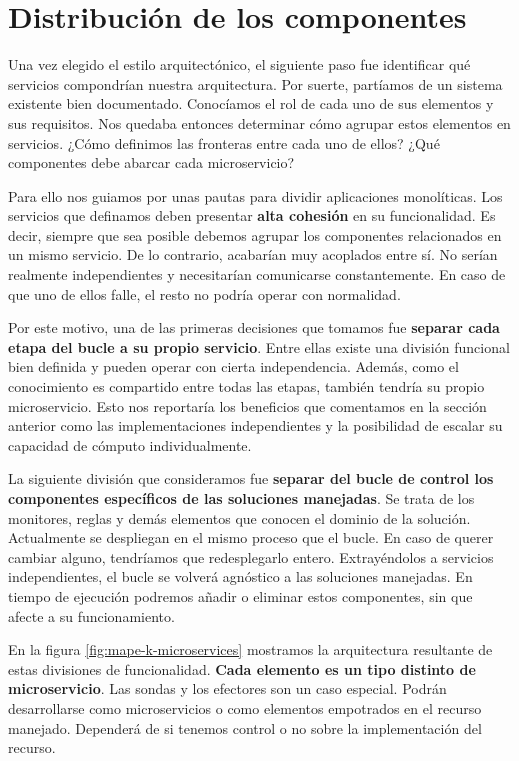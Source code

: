 \section{Distribución de los componentes}

Una vez elegido el estilo arquitectónico, el siguiente paso fue identificar qué servicios compondrían nuestra arquitectura. Por suerte, partíamos de un sistema existente bien documentado. Conocíamos el rol de cada uno de sus elementos y sus requisitos. Nos quedaba entonces determinar cómo agrupar estos elementos en servicios. ¿Cómo definimos las fronteras entre cada uno de ellos? ¿Qué componentes debe abarcar cada microservicio?

Para ello nos guiamos por unas pautas para dividir aplicaciones monolíticas. \cite{newmanBuildingMicroservicesDesigning2021} Los servicios que definamos deben presentar \textbf{alta cohesión} en su funcionalidad. Es decir, siempre que sea posible debemos agrupar los componentes relacionados en un mismo servicio. De lo contrario, acabarían muy acoplados entre sí. No serían realmente independientes y necesitarían comunicarse constantemente. En caso de que uno de ellos falle, el resto no podría operar con normalidad.

Por este motivo, una de las primeras decisiones que tomamos fue \textbf{separar cada etapa del bucle a su propio servicio}. Entre ellas existe una división funcional bien definida y pueden operar con cierta independencia. Además, como el conocimiento es compartido entre todas las etapas, también tendría su propio microservicio. Esto nos reportaría los beneficios que comentamos en la sección anterior como las implementaciones independientes y la posibilidad de escalar su capacidad de cómputo individualmente.

La siguiente división que consideramos fue \textbf{separar del bucle de control los componentes específicos de las soluciones manejadas}. Se trata de los monitores, reglas y demás elementos que conocen el dominio de la solución. Actualmente se despliegan en el mismo proceso que el bucle. En caso de querer cambiar alguno, tendríamos que redesplegarlo entero. Extrayéndolos a servicios independientes, el bucle se volverá agnóstico a las soluciones manejadas. En tiempo de ejecución podremos añadir o eliminar estos componentes, sin que afecte a su funcionamiento.

En la figura \ref{fig:mape-k-microservices} mostramos la arquitectura resultante de estas divisiones de funcionalidad. \textbf{Cada elemento es un tipo distinto de microservicio}. Las sondas y los efectores son un caso especial. Podrán desarrollarse como microservicios o como elementos empotrados en el recurso manejado. Dependerá de si tenemos control o no sobre la implementación del recurso.

